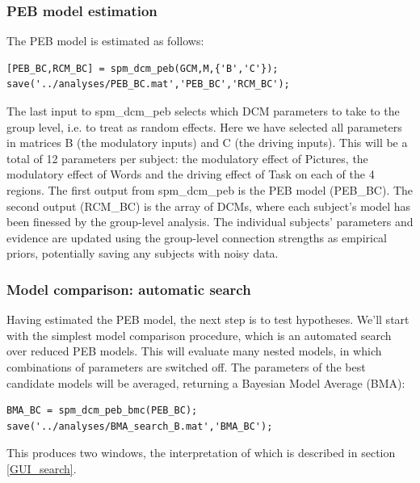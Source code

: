 \documentclass{article}
\begin{document}
\subsubsection{PEB model estimation}
The PEB model is estimated as follows:

\begin{lstlisting}[style=Matlab-editor,caption=PEB estimation]
[PEB_BC,RCM_BC] = spm_dcm_peb(GCM,M,{'B','C'});
save('../analyses/PEB_BC.mat','PEB_BC','RCM_BC');
\end{lstlisting}

The last input to spm\_dcm\_peb selects which DCM parameters to take to the group level, i.e. to treat as random effects. Here we have selected all parameters in matrices B (the modulatory inputs) and C (the driving inputs). This will be a total of 12 parameters per subject: the modulatory effect of Pictures, the modulatory effect of Words and the driving effect of Task on each of the 4 regions. The first output from spm\_dcm\_peb is the PEB model (PEB\_BC). The second output (RCM\_BC) is the array of DCMs, where each subject's model has been finessed by the group-level analysis. The individual subjects' parameters and evidence are updated using the group-level connection strengths as empirical priors, potentially saving any subjects with noisy data.

\subsubsection{Model comparison: automatic search}

Having estimated the PEB model, the next step is to test hypotheses. We'll start with the simplest model comparison procedure, which is an automated search over reduced PEB models. This will evaluate many nested models, in which combinations of parameters are switched off. The parameters of the best candidate models will be averaged, returning a Bayesian Model Average (BMA):

\begin{lstlisting}[style=Matlab-editor,caption=Automatic PEB search]
BMA_BC = spm_dcm_peb_bmc(PEB_BC);
save('../analyses/BMA_search_B.mat','BMA_BC');          
\end{lstlisting}

This produces two windows, the interpretation of which is described in section \ref{GUI_search}.
\end{document}
